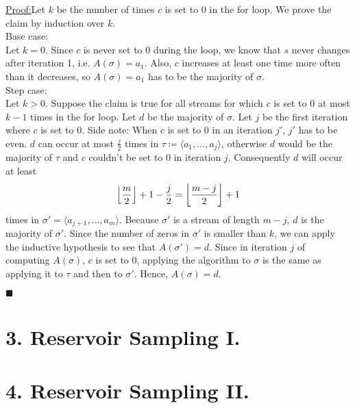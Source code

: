 \documentclass{article}
\DeclarePairedDelimiter\floor{\lfloor}{\rfloor}
\newenvironment{claimproof}[1]{\par\noindent\underline{Proof:}\space#1}{\hfill $\blacksquare$}
\begin{document}
\begin{claimproof}
Let $k$ be the number of times $c$ is set to 0 in the for loop. We prove the claim by induction over $k$. \\

Base case:\\
Let $k=0$. Since $c$ is never set to $0$ during the loop,
we know that $s$ never changes after iteration 1, i.e. $A(\sigma) = a_1$.
Also, $c$ increases at least one time more often than it decreases,
so $A(\sigma) = a_1$ has to be the majority of $\sigma$. \\

Step case:\\
Let $k>0$. Suppose the claim is true for all streams for which $c$ is set to 0 at most $k-1$ times in the for loop.
Let $d$ be the majority of $\sigma$. Let $j$ be the first iteration where $c$ is set to 0.
Side note: When c is set to 0 in an iteration $j'$, $j'$ has to be even.
$d$ can occur at most $\frac{j}{2}$ times in $\tau \coloneqq \langle a_1, \hdots, a_j \rangle$,
otherwise $d$ would be the majority of $\tau$ and $c$ couldn't be set to 0 in iteration $j$. Consequently $d$ will occur at least
\[
\floor*{\frac{m}{2}} + 1 - \frac{j}{2} = \floor*{\frac{m-j}{2}} + 1
\]
times in $\sigma' = \langle a_{j+1}, \hdots, a_m \rangle$.
Because $\sigma'$ is a stream of length $m-j$, $d$ is the majority of $\sigma'$.
Since the number of zeros in $\sigma'$ is smaller than $k$,
we can apply the inductive hypothesis to see that $A(\sigma') = d$.
    Since in iteration $j$ of computing $A(\sigma)$, $c$ is set to 0, applying the algorithm to $\sigma$ is the same as
applying it to $\tau$ and then to $\sigma'$. Hence, $A(\sigma) = d$.

\end{claimproof}


\section*{3. Reservoir Sampling I.}



\section*{4. Reservoir Sampling II.}



\end{document}

